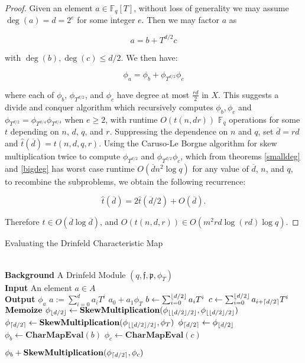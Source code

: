 \documentclass{acmart}
\theoremstyle{remark}
\numberwithin{equation}{section}
\newcommand{\frakf}{\mathfrak{f}}
\DeclarePairedDelimiter\ceil{\lceil}{\rceil}
\DeclarePairedDelimiter\floor{\lfloor}{\rfloor}
\begin{document}
\begin{proof}
Given an element $a \in \mathbb{F}_q[T]$, without loss of generality we may assume $\deg(a) = d = 2^{e}$ for some integer $e$. Then we may factor $a$ as

\[a = b + T^{d/2} c \] 

\noindent with $\deg(b), \deg(c) \leq d/2$. We then have:

\[\phi_a = \phi_b + \phi_{T^{d/2}} \phi_c\]

\noindent where each of $\phi_b$, $\phi_{T^{d/2}}$, and $\phi_c$ have degree at most $\frac{rd}{2}$ in $X$. This suggests a divide and conquer algorithm which recursively computes $\phi_b, \phi_c$ and $\phi_{T^{d/2}} = \phi_{T^{d/4}}\phi_{T^{d/4}}$ when $e \geq 2$, with runtime $O(t(n,dr))$ $\mathbb{F}_q$ operations for some $t$ depending on $n$, $d$, $q$, and $r$. Suppressing the dependence on $n$ and $q$, set $\overline{d} = rd$ and $\hat{t}(\overline{d}) = t(n, d, q, r)$. Using the Caruso-Le Borgne algorithm for skew multiplication twice to compute $\phi_{T^{d/2}}$ and $\phi_{T^{d/2}} \phi_c$, which from theorems \ref{smalldeg} and \ref{bigdeg} has worst case runtime $O(\overline{d}n^2 \log q)$ for any value of $\overline{d}$, $n$, and $q$, to recombine the subproblems, we obtain the following recurrence:

\[ \hat{t}(\overline{d}) = 2 \hat{t}(\overline{d}/2) + O(\overline{d}).\]

\noindent Therefore $\hat{t} \in O( \overline{d} \log \overline{d})$, and $O(t(n,d,r)) \in O(m^2 rd \log (rd) \log q)$.

\end{proof}

\begin{algorithm}
\caption{Evaluating the Drinfeld Characteristic Map}\label{charmap}
\begin{algorithmic}[1]
 \\
 \hspace*{\algorithmicindent} \textbf{Background} A Drinfeld Module $(q,\frakf,\mathfrak{p}, \phi_T)$ \\
 \hspace*{\algorithmicindent} \textbf{Input} An element $a \in A$ \\
 \hspace*{\algorithmicindent} \textbf{Output} $\phi_a$
 \State $a := \sum_{i=0}^d a_i T^i$
 \Return $a_0 + a_1 \phi_T$
 \EndIf
 \State $b \gets \sum_{i=0}^{\floor{d/2}}a_iT^i$
 \State $c \gets \sum_{i = 0}^{\floor{d/2}}a_{i + \ceil{d/2}} T^i$
 \State $\textbf{Memoize } \phi_{\floor{d/2}} \gets \textbf{SkewMultiplication}(\phi_{\floor{\floor{d/2}/2}}, \phi_{\floor{\floor{d/2}/2}}) $
\State $\phi_{\ceil{d/2}} \gets \textbf{SkewMultiplication}(\phi_{\floor{\floor{d/2}/2}}, \phi_{T}) $
\Else 
\State $\phi_{\ceil{d/2}} \gets \phi_{\floor{d/2}}$ 
\EndIf
\State $\phi_b \gets \textbf{CharMapEval}(b)$
\State $\phi_c \gets \textbf{CharMapEval}(c)$

 \Return $\phi_b + \textbf{SkewMultiplication}(\phi_{\ceil{d/2}}, \phi_c)$

\EndProcedure
\end{algorithmic}
\end{algorithm}
\end{document}

